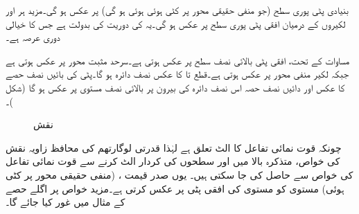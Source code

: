 بنیادی پٹی  پوری  سطح  (جو منفی حقیقی محور پر کٹی ہوئی ہوئی ہو گی) پر عکس ہو گی۔مزید ہر  اور  لکیروں کے درمیان افقی پٹی  پوری  سطح پر عکس ہو گی۔یہ  کی دوریت کی بدولت ہے جس کا خیالی دوری عرصہ  ہے۔

مساوات  کے تحت، افقی پٹی  بالائی نصف  سطح پر عکس ہوتی ہے۔سرحد  مثبت   محور پر عکس ہوتی ہے جبکہ لکیر  منفی  محور پر عکس ہوتی ہے۔قطع  تا  کا عکس نصف دائرہ  ہو گا۔پٹی کی بائیں نصف  حصے کا عکس  اور دائیں نصف  حصہ  اس نصف دائرہ   کی بیرون پر بالائی نصف  مستوی پر عکس ہو گا (شکل )۔
\begin{figure}
\centering
\begin{subfigure}{0.5\textwidth}
\centering
{}
\end{subfigure}%
\begin{subfigure}{0.5\textwidth}
\centering
{}
\end{subfigure}%
\caption{نقش }
\label{شکل_نقش_قوت-نمائی_ب}
\end{figure}

چونکہ قوت نمائی تفاعل کا الٹ  تعلق    ہے لہٰذا قدرتی لوگارتھم کی محافظ زاویہ نقش کی خواص، متذکرہ بالا میں  اور  سطحوں کی کردار  الٹ کرنے سے  قوت نمائی تفاعل کی خواص سے حاصل کی جا سکتی ہیں۔ یوں صدر قیمت ، (منفی حقیقی محور پر کٹی ہوئی)   مستوی کو  مستوی کی افقی پٹی  پر عکس کرتی ہے۔مزید خواص پر اگلے حصے کے مثال  میں غور کیا جائے گا۔

